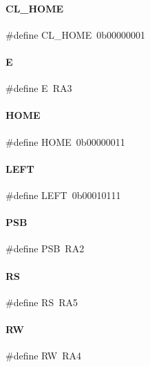 \paragraph{C\+L\+\_\+\+H\+O\+ME}
{\footnotesize\ttfamily \#define C\+L\+\_\+\+H\+O\+ME~0b00000001}

\mbox{\label{a00032_a07484107e6d9fdf38b53edf631d6511d}} 
\paragraph{E}
{\footnotesize\ttfamily \#define E~R\+A3}

\mbox{\label{a00032_a0e26ea2db1b570d1a6fe1ac180ef4541}} 
\paragraph{H\+O\+ME}
{\footnotesize\ttfamily \#define H\+O\+ME~0b00000011}

\mbox{\label{a00032_a437ef08681e7210d6678427030446a54}} 
\paragraph{L\+E\+FT}
{\footnotesize\ttfamily \#define L\+E\+FT~0b00010111}

\mbox{\label{a00032_a85d6b002cc4fc92f98aeaae45c9ea113}} 
\paragraph{P\+SB}
{\footnotesize\ttfamily \#define P\+SB~R\+A2}

\mbox{\label{a00032_af8903d8eea3868940c60af887473b152}} 
\paragraph{RS}
{\footnotesize\ttfamily \#define RS~R\+A5}

\mbox{\label{a00032_afc4ded33ac0ca43defcce639e965748a}} 
\paragraph{RW}
{\footnotesize\ttfamily \#define RW~R\+A4}

